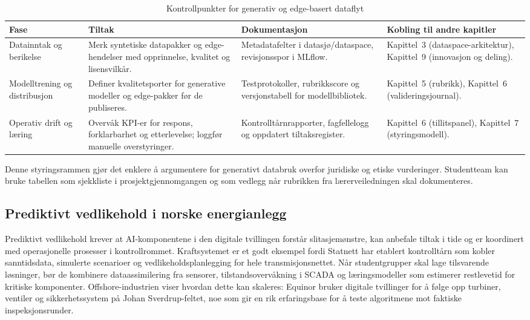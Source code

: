 \begin{table}[htbp]
    \centering
    \caption{Kontrollpunkter for generativ og edge-basert dataflyt}
    \label{tab:kontrollpunkter-generativ}
    \begin{tabular}{p{3.6cm}p{4.0cm}p{4.2cm}p{3.8cm}}
        \toprule
        \textbf{Fase} & \textbf{Tiltak} & \textbf{Dokumentasjon} & \textbf{Kobling til andre kapitler} \\
        \midrule
        Datainntak og berikelse & Merk syntetiske datapakker og edge-hendelser med opprinnelse, kvalitet og lisensvilkår. & Metadatafelter i datasjø/dataspace, revisjonsspor i MLflow. & Kapittel~3 (dataspace-arkitektur), Kapittel~9 (innovasjon og deling). \\
        \addlinespace
        Modelltrening og distribusjon & Definer kvalitetsporter for generative modeller og edge-pakker før de publiseres. & Testprotokoller, rubrikkscore og versjonstabell for modellbibliotek. & Kapittel~5 (rubrikk), Kapittel~6 (valideringsjournal). \\
        \addlinespace
        Operativ drift og læring & Overvåk KPI-er for respons, forklarbarhet og etterlevelse; loggfør manuelle overstyringer. & Kontrolltårnrapporter, fagfellelogg og oppdatert tiltaksregister. & Kapittel~6 (tillitspanel), Kapittel~7 (styringsmodell). \\
        \bottomrule
    \end{tabular}
\end{table}

Denne styringsrammen gjør det enklere å argumentere for generativt databruk overfor juridiske og etiske vurderinger. Studentteam kan bruke tabellen som sjekkliste i prosjektgjennomgangen og som vedlegg når rubrikken fra lærerveiledningen skal dokumenteres.

\subsection{Prediktivt vedlikehold i norske energianlegg}
Prediktivt vedlikehold krever at AI-komponentene i den digitale tvillingen forstår slitasjemønstre, kan anbefale tiltak i tide og er koordinert med operasjonelle prosesser i kontrollrommet. Kraftsystemet er et godt eksempel fordi Statnett har etablert kontrolltårn som kobler sanntidsdata, simulerte scenarioer og vedlikeholdsplanlegging for hele transmisjonsnettet.\citep{statnett2024kontrolltarn} Når studentgrupper skal lage tilsvarende løsninger, bør de kombinere dataassimilering fra sensorer, tilstandsovervåkning i SCADA og læringsmodeller som estimerer restlevetid for kritiske komponenter. Offshore-industrien viser hvordan dette kan skaleres: Equinor bruker digitale tvillinger for å følge opp turbiner, ventiler og sikkerhetssystem på Johan Sverdrup-feltet, noe som gir en rik erfaringsbase for å teste algoritmene mot faktiske inspeksjonsrunder.\citep{equinor2021johansverdrup}

